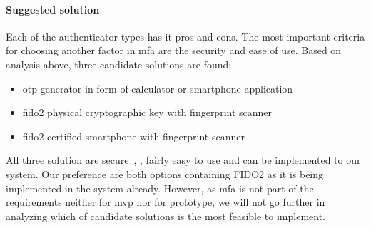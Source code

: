 \paragraph{Suggested solution}
Each of the authenticator types has it pros and cons. The most important criteria for choosing another factor in \acrshort{mfa} are the security and ease of use. Based on analysis above, three candidate solutions are found:
\begin{itemize}[noitemsep]
    \item \acrshort{otp} generator in form of calculator or smartphone application
    \item \acrshort{fido}2 physical cryptographic key with fingerprint scanner
    \item \acrshort{fido}2 certified smartphone with fingerprint scanner
\end{itemize}
All three solution are secure~\cite{Grassi2017DigitalManagement}, \cite{FIDOFIDO2Project}, fairly easy to use and can be implemented to our system. Our preference are both options containing FIDO2 as it is being implemented in the system already. However, as \acrshort{mfa} is not part of the requirements neither for \acrshort{mvp} nor for prototype, we will not go further in analyzing which of candidate solutions is the most feasible to implement.